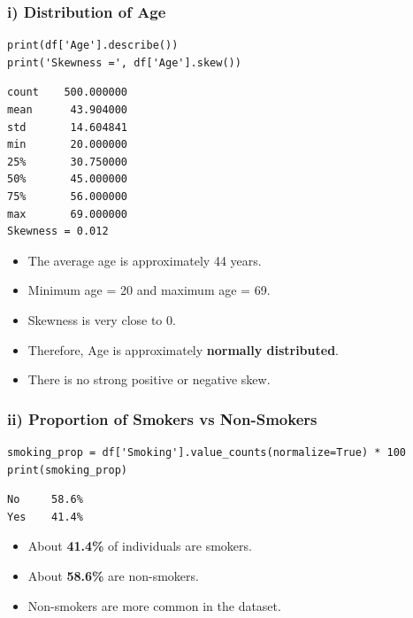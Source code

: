 \documentclass[12pt,a4paper]{article}
\begin{document}
\subsubsection{i) Distribution of Age}

\begin{lstlisting}
print(df['Age'].describe())
print('Skewness =', df['Age'].skew())
\end{lstlisting}

\begin{outputbox}
\begin{verbatim}
count    500.000000
mean      43.904000
std       14.604841
min       20.000000
25%       30.750000
50%       45.000000
75%       56.000000
max       69.000000
Skewness = 0.012
\end{verbatim}
\end{outputbox}

\begin{interpbox}
\begin{itemize}[noitemsep]
  \item The average age is approximately 44 years.
  \item Minimum age = 20 and maximum age = 69.
  \item Skewness is very close to 0.
  \item Therefore, Age is approximately \textbf{normally distributed}.
  \item There is no strong positive or negative skew.
\end{itemize}
\end{interpbox}

\subsubsection{ii) Proportion of Smokers vs Non-Smokers}

\begin{lstlisting}
smoking_prop = df['Smoking'].value_counts(normalize=True) * 100
print(smoking_prop)
\end{lstlisting}

\begin{outputbox}
\begin{verbatim}
No     58.6%
Yes    41.4%
\end{verbatim}
\end{outputbox}

\begin{interpbox}
\begin{itemize}[noitemsep]
  \item About \textbf{41.4\%} of individuals are smokers.
  \item About \textbf{58.6\%} are non-smokers.
  \item Non-smokers are more common in the dataset.
\end{itemize}
\end{interpbox}
\end{document}
